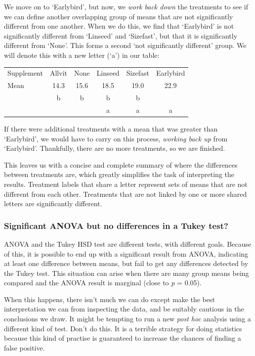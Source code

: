 \documentclass[
]{book}
\newenvironment{greybox}{
  \definecolor{shadecolor}{rgb}{0.95,0.95,0.95}  %
  \color{black}
  \begin{shaded}}
 {\end{shaded}}
\newenvironment{infobox}[1]
  {
  \begin{itemize}
  \renewcommand{\labelitemi}{
    \raisebox{-.7\height}[0pt][0pt]{
      {\setkeys{Gin}{width=3em,keepaspectratio}
        \texttt{[image: images/\#1]}}
    }
  }
  \setlength{\fboxsep}{1em}
  \begin{greybox}
  \item
  }
  {
  \end{greybox}
  \end{itemize}
  }
\begin{document}
We move on to `Earlybird', but now, we \emph{work back down} the treatments to see if we can define another overlapping group of means that are not significantly different from one another. When we do this, we find that `Earlybird' is not significantly different from `Linseed' and `Sizefast', but that it is significantly different from `None'. This forms a second `not significantly different' group. We will denote this with a new letter (`a') in our table:

\begin{longtable}[]{@{}lccccc@{}}
\toprule
& & & & & \\
\midrule
\endhead
Supplement & Allvit & None & Linseed & Sizefast & Earlybird \\
Mean & 14.3 & 15.6 & 18.5 & 19.0 & 22.9 \\
& b & b & b & b & \\
& & & a & a & a \\
\bottomrule
\end{longtable}

If there were additional treatments with a mean that was greater than `Earlybird', we would have to carry on this process, \emph{working back up} from `Earlybird'. Thankfully, there are no more treatments, so we are finished.

This leaves us with a concise and complete summary of where the differences between treatments are, which greatly simplifies the task of interpreting the results. Treatment labels that share a letter represent sets of means that are not different from each other. Treatments that are not linked by one or more shared letters are significantly different.

\begin{infobox}{warning}

\hypertarget{significant-anova-but-no-differences-in-a-tukey-test}{%
\subsubsection*{Significant ANOVA but no differences in a Tukey test?}\label{significant-anova-but-no-differences-in-a-tukey-test}}

ANOVA and the Tukey HSD test are different tests, with different goals. Because of this, it is possible to end up with a significant result from ANOVA, indicating at least one difference between means, but fail to get any differences detected by the Tukey test. This situation can arise when there are many group means being compared and the ANOVA result is marginal (close to \emph{p} = 0.05).

When this happens, there isn't much we can do except make the best interpretation we can from inspecting the data, and be suitably cautious in the conclusions we draw. It might be tempting to run a new \emph{post hoc} analysis using a different kind of test. Don't do this. It is a terrible strategy for doing statistics because this kind of practise is guaranteed to increase the chances of finding a false positive.

\end{infobox}
\end{document}
